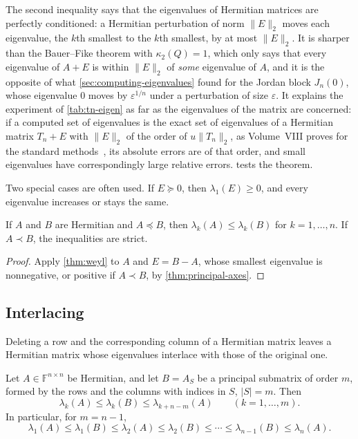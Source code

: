 The second inequality says that the eigenvalues of Hermitian matrices are perfectly conditioned: a Hermitian perturbation of norm $\|E\|_2$ moves each eigenvalue, the $k$th smallest to the $k$th smallest, by at most $\|E\|_2$. It is sharper than the Bauer--Fike theorem with $\kappa_2(Q)=1$, which only says that every eigenvalue of $A+E$ is within $\|E\|_2$ of \emph{some} eigenvalue of $A$, and it is the opposite of what \cref{sec:computing-eigenvalues} found for the Jordan block $J_n(0)$, whose eigenvalue $0$ moves by $\varepsilon^{1/n}$ under a perturbation of size $\varepsilon$. It explains the experiment of \cref{tab:tn-eigen} as far as the eigenvalues of the matrix are concerned: if a computed set of eigenvalues is the exact set of eigenvalues of a Hermitian matrix $T_n+E$ with $\|E\|_2$ of the order of $u\|T_n\|_2$, as Volume~VIII proves for the standard methods~\cite[Sect.~8.3]{golub2013}, its absolute errors are of that order, and small eigenvalues have correspondingly large relative errors.  tests the theorem.

Two special cases are often used. If $E\succeq0$, then $\lambda_1(E)\ge0$, and every eigenvalue increases or stays the same.

\begin{corollary}[Monotonicity]
\label{cor:monotone}
If $A$ and $B$ are Hermitian and $A\preceq B$, then $\lambda_k(A)\le\lambda_k(B)$ for $k=1,\ldots,n$. If $A\prec B$, the inequalities are strict.
\end{corollary}

\begin{proof}
Apply \cref{thm:weyl} to $A$ and $E=B-A$, whose smallest eigenvalue is nonnegative, or positive if $A\prec B$, by \cref{thm:principal-axes}.
\end{proof}

\subsection{Interlacing}

Deleting a row and the corresponding column of a Hermitian matrix leaves a Hermitian matrix whose eigenvalues interlace with those of the original one.

\begin{theorem}
\label{thm:interlacing}
Let $A\in\mathbb F^{n\times n}$ be Hermitian, and let $B=A_S$ be a principal submatrix of order $m$, formed by the rows and the columns with indices in $S$, $|S|=m$. Then
\[
\lambda_k(A)\le\lambda_k(B)\le\lambda_{k+n-m}(A)\qquad(k=1,\ldots,m).
\]
In particular, for $m=n-1$,
\[
\lambda_1(A)\le\lambda_1(B)\le\lambda_2(A)\le\lambda_2(B)\le\cdots\le\lambda_{n-1}(B)\le\lambda_n(A).
\]
\end{theorem}

